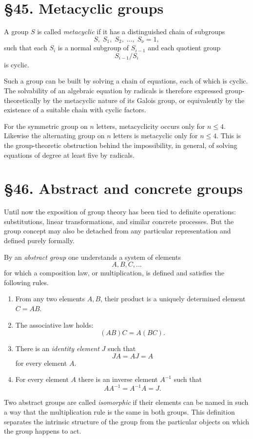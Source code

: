 \documentclass[11pt,a4paper]{book}
\newcommand{\webersection}[2]{\clearpage\section*{\S #1. #2}}
\begin{document}
\webersection{45}{Metacyclic groups}

A group \(S\) is called \emph{metacyclic} if it has a distinguished chain of subgroups
\begin{equation}
S,\; S_1,\; S_2,\;\ldots,\; S_\nu=1,
\end{equation}
such that each \(S_i\) is a normal subgroup of \(S_{i-1}\) and each quotient group
\[
S_{i-1}/S_i
\]
is cyclic.

Such a group can be built by solving a chain of equations, each of which is cyclic.  The solvability of an algebraic equation by radicals is therefore expressed group-theoretically by the metacyclic nature of its Galois group, or equivalently by the existence of a suitable chain with cyclic factors.

For the symmetric group on \(n\) letters, metacyclicity occurs only for \(n\leq 4\).  Likewise the alternating group on \(n\) letters is metacyclic only for \(n\leq 4\).  This is the group-theoretic obstruction behind the impossibility, in general, of solving equations of degree at least five by radicals.

\webersection{46}{Abstract and concrete groups}

Until now the exposition of group theory has been tied to definite operations: substitutions, linear transformations, and similar concrete processes.  But the group concept may also be detached from any particular representation and defined purely formally.

By an \emph{abstract group} one understands a system of elements
\[
A,B,C,\ldots
\]
for which a composition law, or multiplication, is defined and satisfies the following rules.

\begin{enumerate}[label=\arabic*.]
\item From any two elements \(A,B\), their product is a uniquely determined element \(C=AB\).
\item The associative law holds:
\[
(AB)C=A(BC).
\]
\item There is an \emph{identity element} \(J\) such that
\[
JA=AJ=A
\]
for every element \(A\).
\item For every element \(A\) there is an inverse element \(A^{-1}\) such that
\[
AA^{-1}=A^{-1}A=J.
\]
\end{enumerate}

Two abstract groups are called \emph{isomorphic} if their elements can be named in such a way that the multiplication rule is the same in both groups.  This definition separates the intrinsic structure of the group from the particular objects on which the group happens to act.
\end{document}
